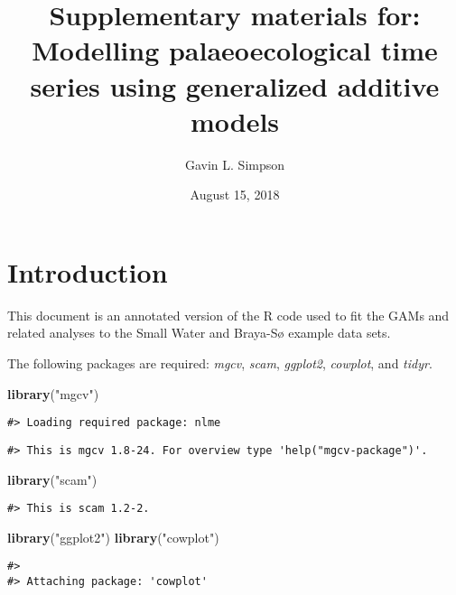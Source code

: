 \documentclass[12pt,]{article}
\title{Supplementary materials for: Modelling palaeoecological time series
using generalized additive models}
\author{Gavin L. Simpson}
\date{August 15, 2018}
\newenvironment{Shaded}{\begin{snugshade}}{\end{snugshade}}
\newcommand{\KeywordTok}[1]{\textcolor[rgb]{0.13,0.29,0.53}{\textbf{{#1}}}}
\newcommand{\StringTok}[1]{\textcolor[rgb]{0.31,0.60,0.02}{{#1}}}
\newcommand{\NormalTok}[1]{{#1}}
\begin{document}
\maketitle

\section{Introduction}\label{introduction}

This document is an annotated version of the R code used to fit the GAMs
and related analyses to the Small Water and Braya-Sø example data sets.

The following packages are required: \emph{mgcv}, \emph{scam},
\emph{ggplot2}, \emph{cowplot}, and \emph{tidyr}.

\begin{Shaded}
\begin{Highlighting}[]
\KeywordTok{library}\NormalTok{(}\StringTok{"mgcv"}\NormalTok{)}
\end{Highlighting}
\end{Shaded}

\begin{verbatim}
#> Loading required package: nlme
\end{verbatim}

\begin{verbatim}
#> This is mgcv 1.8-24. For overview type 'help("mgcv-package")'.
\end{verbatim}

\begin{Shaded}
\begin{Highlighting}[]
\KeywordTok{library}\NormalTok{(}\StringTok{"scam"}\NormalTok{)}
\end{Highlighting}
\end{Shaded}

\begin{verbatim}
#> This is scam 1.2-2.
\end{verbatim}

\begin{Shaded}
\begin{Highlighting}[]
\KeywordTok{library}\NormalTok{(}\StringTok{"ggplot2"}\NormalTok{)}
\KeywordTok{library}\NormalTok{(}\StringTok{"cowplot"}\NormalTok{)}
\end{Highlighting}
\end{Shaded}

\begin{verbatim}
#> 
#> Attaching package: 'cowplot'
\end{verbatim}
\end{document}
